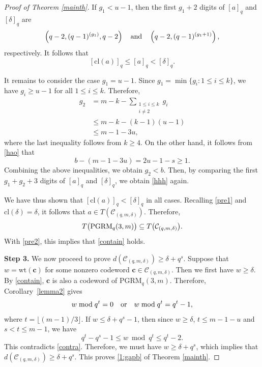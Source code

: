 \documentclass[10pt,a4paper]{amsart}
\newcommand{\PGRM}{\mathrm{PGRM}}
\begin{document}
\begin{proof}[Proof of Theorem \ref{mainth}]
If $g_1<u-1$, then the first $g_1+2$ digits of $[a]_q$ and 
$[\delta]_q$ are 
\begin{equation*}
    \left(q-2,(q-1)^{(g_1)},q-2\right)\quad \hbox{and}\quad 
\left(q-2,(q-1)^{(g_1+1)}\right),
\end{equation*}
respectively. It follows that
\begin{equation} \label{hhh}  
[\mathrm{cl}(a)]_q \le [a]_q < [\delta]_q.
\end{equation}

It remains to consider the case $g_1=u-1$. Since $g_1 = \min \{g_i : 1 \le i \le k\}$, we have $g_i \ge u - 1$ for all $1 \le i \le k$. Therefore,
\begin{align*}
    g_2 &= m - k - \sum_{\substack{1\leq i\leq k\\ i\neq2}}g_i\\
       & \le m - k - (k-1)(u-1) \\
       &\le m - 1 - 3u,
\end{align*}
where the last inequality follows from $k \ge 4$. On the other hand, it follows from \eqref{hao} that
\begin{equation}\label{inequality}
    b - (m - 1 - 3u) = 2u - 1 - s \ge 1.
\end{equation}
Combining the above inequalities, we obtain $g_2 < b$. Then, by comparing the first $g_1 + g_2 + 3$ digits of $[a]_q$ and $[\delta]_q$, we obtain \eqref{hhh} again.


We have thus shown that $[\mathrm{cl}(a)]_q < [\delta]_q$ in all cases. Recalling \eqref{pre1} and $\mathrm{cl}(\delta) = \delta$, it follows that $a \in T(\mathcal{C}_{(q,m,\delta)})$. Therefore,
\begin{equation}\notag
T\bigl(\mathrm{PGRM}_q(3,m)\bigr)
\subseteq
T\bigl(\mathcal{C}_{(q,m,\delta)}\bigr).
\end{equation}
With \eqref{pre2}, this implies that \eqref{contain} holds.

{\bf Step 3.} We now proceed to prove   
$d(\mathcal{C}_{(q,m,\delta)}) \geq \delta+q^{s}$.
Suppose that $w = \mathrm{wt}(\mathbf{c})$ for some nonzero codeword $\mathbf{c} \in \mathcal{C}_{(q,m,\delta)}$. Then we first have $w \ge \delta$.
By \eqref{contain}, $\mathbf c$ is also a 
codeword of $\PGRM_q(3,m)$. Therefore,  Corollary~\ref{lemma2}
gives 
\begin{equation}\notag
    w \bmod q^t = 0 \quad \text{or} \quad w \bmod q^t = q^t - 1,
\end{equation}
where $t=\lfloor(m-1)/3\rfloor$.
 If $w \le \delta + q^s - 1$, then since $w\geq \delta$,  $t \le m - 1 - u$ and $s < t \le m - 1$, we have
\begin{equation*}
    q^t - q^s - 1 \le w \bmod q^t \le q^t - 2.
\end{equation*}
This contradicts \eqref{contra}. Therefore, we must have $w \ge \delta + q^s$, which implies that $d(\mathcal{C}_{(q,m,\delta)}) \geq \delta+q^{s}$. This proves \eqref{1:gapb} of Theorem \ref{mainth}. 


\end{proof}
\end{document}
